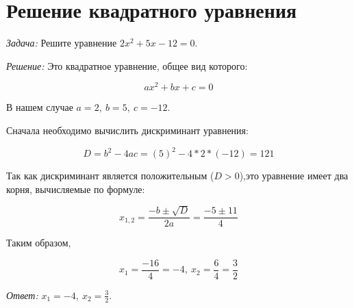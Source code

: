 \documentclass{book}
\begin{document}
\section{Решение квадратного уравнения}

\textit{Задача:} 
Решите уравнение $ 2x^2 + 5x - 12 = 0 $.

\hspace{5mm}
\textit{Решение:} 
Это квадратное уравнение, общее вид которого:

$$ax^2 + bx + c = 0$$

В нашем случае $ a = 2, \ b = 5, \ c = -12 $.

Сначала необходимо вычислить дискриминант уравнения:

$$D = b^2 - 4ac = (5)^2 - 4 * 2 * (-12) = 121$$

Так как дискриминант является положительным ($ D > 0 $),это уравнение имеет два корня, вычисляемые по формуле:

$$x_{1,2} = \frac{-b \pm \sqrt{D}}{2a} = \frac{-5 \pm 11}{4}$$

Таким образом,

$$x_1 = \frac{-16}{4} = -4, \ x_2 = \frac{6}{4} = \frac{3}{2}$$

\textit{Ответ:} $ x_1 = -4, \ x_2 = \frac{3}{2} $.
\end{document}
